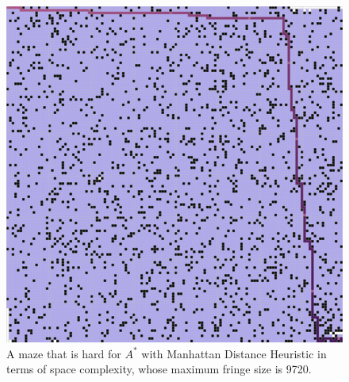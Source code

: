 \documentclass[letter]{article}
\begin{document}
\begin{enumerate}[resume]
\begin{enumerate}
\begin{enumerate}
\begin{figure}
					\includegraphics[width=\textwidth]{../pics/amf/9720.png}
					\caption{\label{fig:amf1}A maze that is hard for $ A^* $ with Manhattan Distance Heuristic in terms of space complexity, whose maximum fringe size is 9720. }
					

\end{figure}
\end{enumerate}
\end{enumerate}
\end{enumerate}
\end{document}

